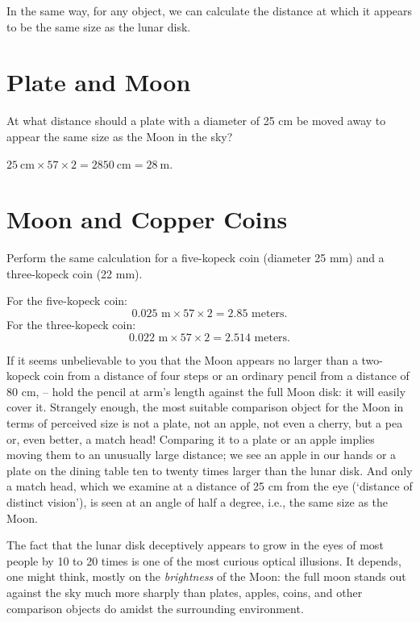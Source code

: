 In the same way, for any object, we can calculate the distance at which it appears to be the same size as the lunar disk.

\section{Plate and Moon} 
\label{sec-3.3}

\ques At what distance should a plate with a diameter of 25 cm be moved away to appear the same size as the Moon in the sky?

\ans $\SI{25}{\centi\meter} \times 57 \times 2 = \SI{2850}{\centi\meter} = \SI{28}{\meter}$.

\clearpage 

\section{Moon and Copper Coins} 
\label{sec-3.4}

\ques Perform the same calculation for a five-kopeck coin (diameter 25 mm) and a three-kopeck coin (22 mm).

\ans For the five-kopeck coin: 
\begin{equation*}%
0.025 \text{ m} \times 57 \times 2 = 2.85 \text{ meters}.
\end{equation*}
For the three-kopeck coin: 
\begin{equation*}%
0.022 \text{ m} \times 57 \times 2 = 2.514 \text{ meters}.
\end{equation*}

If it seems unbelievable to you that the Moon appears no larger than a two-kopeck coin from a distance of four steps or an ordinary pencil from a distance of 80 cm, -- hold the pencil at arm's length against the full Moon disk: it will easily cover it. Strangely enough, the most suitable comparison object for the Moon in terms of perceived size is not a plate, not an apple, not even a cherry, but a pea or, even better, a match head! Comparing it to a plate or an apple implies moving them to an unusually large distance; we see an apple in our hands or a plate on the dining table ten to twenty times larger than the lunar disk. And only a match head, which we examine at a distance of 25 cm from the eye (`distance of distinct vision'), is seen at an angle of half a degree, i.e., the same size as the Moon.

The fact that the lunar disk deceptively appears to grow in the eyes of most people by 10 to 20 times is one of the most curious optical illusions. It depends, one might think, mostly on the \emph{brightness} of the Moon: the full moon stands out against the sky much more sharply than plates, apples, coins, and other comparison objects do amidst the surrounding environment.

